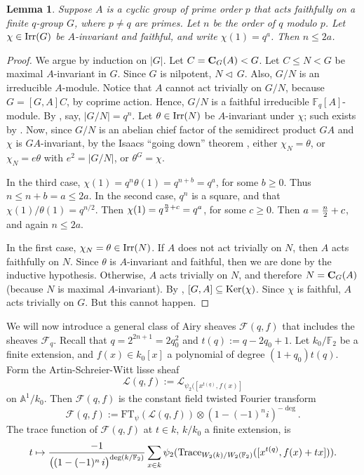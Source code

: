 \documentclass[11pt]{amsart}
\theoremstyle{plain}
\newtheorem{lem}[thm]{Lemma}
\theoremstyle{definition}
\numberwithin{thm}{section}
\numberwithin{equation}{thm}
\newcommand{\Trace}{{\rm Trace}}
\newcommand{\Ker}{{\rm Ker}}
\def\irr#1{{\rm Irr}(#1)}
\def\cent#1#2{{\bf C}_{#1}(#2)}
\def\nor{\triangleleft\,}
\def\sbs{\subseteq}
\newcommand{\sF}{{\mathcal F}}
\newcommand{\sL}{{\mathcal L}}
\newcommand{\A}{{\mathbb A}}
\newcommand{\F}{{\mathbb F}}
\newcommand{\Z}{{\mathbb Z}}
\newcommand{\0}{\emptyset}
\newcommand{\FT}{\mathrm{FT}}
\begin{document}
\begin{lem}\label{action}
Suppose $A$ is a cyclic group of  prime order $p$ that
acts faithfully on a finite $q$-group $G$, where $p\ne q$ are primes.
Let $n$ be the order of $q$ modulo $p$.
Let $\chi \in {\rm Irr}(G)$ be $A$-invariant and faithful, and write $\chi(1)=q^a$. Then $n \le 2a$.
\end{lem}

\begin{proof}
We argue by induction on $|G|$. 
Let $C=\cent GA<G$. Let $C\le N<G$ be maximal $A$-invariant in $G$.
Since $G$ is nilpotent, $N \nor G$. Also, $G/N$ is an irreducible
$A$-module. Notice that $A$ cannot act trivially on $G/N$, because $G=[G,A]C$, by coprime action. Hence, $G/N$ is a faithful irreducible $\F_q[A]$-module.
By  \cite[Example 2.7]{MW}, say, $|G/N|=q^n$. 
Let $\theta \in {\rm Irr}(N)$ be $A$-invariant under $\chi$; such exists by \cite[Theorem 13.27]{Is}.
Now, since $G/N$ is an abelian
 chief factor of the semidirect product 
 $GA$ and $\chi$ is $GA$-invariant, by the Isaacs ``going down'' theorem \cite[Theorem 6.18]{Is},  
either
$\chi_N=\theta$, or $\chi_N=e\theta$ with $e^2=|G/N|$, or $\theta^G=\chi$.

In the third case, $\chi(1)=q^n \theta(1)=q^{n+b}=q^a$, for some $b\ge 0$.
Thus $n\le n+b=a \le 2a$. In the second case,
$q^n$ is a square, and that $\chi(1)/\theta(1)=q^{n/2}$. Then $\chi(1)=q^{{n\over 2} +c}=q^a$, for some $c\ge 0$.
Then $a={n \over 2} + c$, and again $n \le 2a$.

In the first case, $\chi_N=\theta \in \irr N$.
If $A$ does not act trivially on $N$, then $A$ acts faithfully on $N$.
Since $\theta$ is $A$-invariant and faithful, then we are done by the inductive hypothesis.
Otherwise, $A$ acts trivially on $N$, and therefore
 $N=\cent GA$ (because $N$ is maximal $A$-invariant).  
 By \cite[Lemma 2.1]{N},
$[G,A] \sbs \Ker(\chi)$. Since $\chi$ is faithful, $A$ acts trivially on $G$.
But this cannot happen. 
\end{proof}

We will now introduce a general class of Airy sheaves $\sF(q,f)$ that includes the sheaves $\sF_q$. Recall that 
$q=2^{2n+1}=2q_0^2$ and $t(q):=q-2q_0+1$.
Let $k_0/\F_2$ be a finite extension, and $f(x) \in k_0[x]$ a polynomial of degree $(1+q_0)t(q)$. Form the Artin-Schreier-Witt lisse sheaf
$$\sL(q,f):=\sL_{\psi_2([x^{t(q)},f(x)]}$$
on $\A^1/k_0$. Then $\sF(q,f)$ is the constant field twisted Fourier transform 
\begin{equation}\label{airy-g}
  \sF(q,f):=\FT_\psi(\sL(q,f))\otimes (1-(-1)^ni)^{-\deg}.
\end{equation}  
The trace function of $\sF(q,f)$ at $t \in k$, $k/k_0$ a finite extension, is
\begin{equation}\label{airy-g1}
  t \mapsto \frac{-1}{\bigl((1-(-1)^n\,i\bigr)^{\deg(k/\F_2)}}\sum_{x \in k}\psi_2(\Trace_{W_2(k)/W_2(\F_2)}([x^{t(q)},f(x)+tx])).
\end{equation}  
\end{document}
